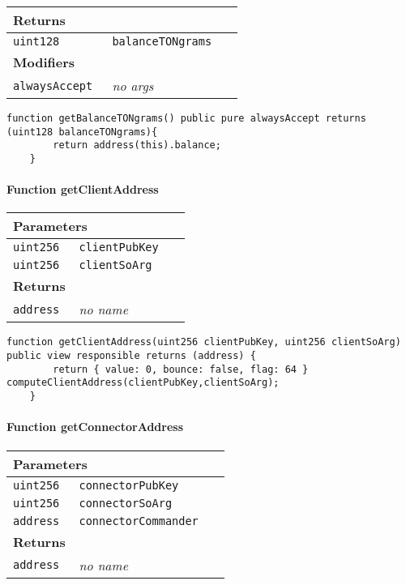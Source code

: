\ifsoltables
\noindent\begin{tabular}{|l|l|p{5cm}|}\hline
\multicolumn{3}{|l|}{\bf Returns}\\\hline
\tt uint128 & \tt balanceTONgrams &\\\hline
\multicolumn{3}{|l|}{\bf Modifiers}\\\hline
\tt alwaysAccept & {\em no args} &\\\hline
\end{tabular}
\fi

\vspace{2cm}

\begin{lstlisting}[firstnumber=334]
	function getBalanceTONgrams() public pure alwaysAccept returns (uint128 balanceTONgrams){
		return address(this).balance;
	}
\end{lstlisting}

\paragraph{Function getClientAddress}


\ifsoltables
\noindent\begin{tabular}{|l|l|p{5cm}|}\hline
\multicolumn{3}{|l|}{\bf Parameters}\\\hline
\tt uint256 & \tt clientPubKey &\\\hline
\tt uint256 & \tt clientSoArg &\\\hline
\multicolumn{3}{|l|}{\bf Returns}\\\hline
\tt address & {\em no name} &\\\hline
\end{tabular}
\fi

\vspace{2cm}

\begin{lstlisting}[firstnumber=118]
	function getClientAddress(uint256 clientPubKey, uint256 clientSoArg) public view responsible returns (address) {
		return { value: 0, bounce: false, flag: 64 } computeClientAddress(clientPubKey,clientSoArg);
	}
\end{lstlisting}

\paragraph{Function getConnectorAddress}


\ifsoltables
\noindent\begin{tabular}{|l|l|p{5cm}|}\hline
\multicolumn{3}{|l|}{\bf Parameters}\\\hline
\tt uint256 & \tt connectorPubKey &\\\hline
\tt uint256 & \tt connectorSoArg &\\\hline
\tt address & \tt connectorCommander &\\\hline
\multicolumn{3}{|l|}{\bf Returns}\\\hline
\tt address & {\em no name} &\\\hline
\end{tabular}
\fi

